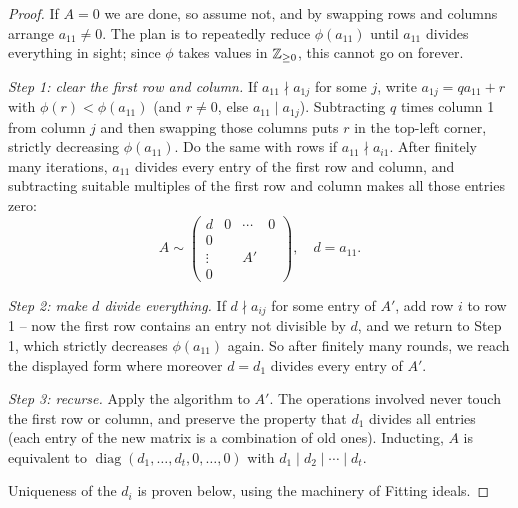 \documentclass[a4paper]{scrartcl}
\begin{document}
\begin{proof}
	If $A = 0$ we are done, so assume not, and by swapping rows and columns arrange $a_{11} \neq 0$. The plan is to repeatedly reduce $\phi(a_{11})$ until $a_{11}$ divides everything in sight; since $\phi$ takes values in $\mathbb{Z}_{\geq 0}$, this cannot go on forever.

	\emph{Step 1: clear the first row and column.} If $a_{11} \nmid a_{1j}$ for some $j$, write $a_{1j} = q a_{11} + r$ with $\phi(r) < \phi(a_{11})$ (and $r \neq 0$, else $a_{11} \mid a_{1j}$). Subtracting $q$ times column 1 from column $j$ and then swapping those columns puts $r$ in the top-left corner, strictly decreasing $\phi(a_{11})$. Do the same with rows if $a_{11} \nmid a_{i1}$. After finitely many iterations, $a_{11}$ divides every entry of the first row and column, and subtracting suitable multiples of the first row and column makes all those entries zero:
	$$
	A \sim \begin{pmatrix}
		d & 0 & \cdots & 0 \\
		0 & & & \\
		\vdots & & A' & \\
		0 & & &
	\end{pmatrix}, \quad d = a_{11}.
	$$

	\emph{Step 2: make $d$ divide everything.} If $d \nmid a_{ij}$ for some entry of $A'$, add row $i$ to row 1 -- now the first row contains an entry not divisible by $d$, and we return to Step 1, which strictly decreases $\phi(a_{11})$ again. So after finitely many rounds, we reach the displayed form where moreover $d = d_1$ divides every entry of $A'$.

	\emph{Step 3: recurse.} Apply the algorithm to $A'$. The operations involved never touch the first row or column, and preserve the property that $d_1$ divides all entries (each entry of the new matrix is a combination of old ones). Inducting, $A$ is equivalent to $\operatorname{diag}(d_1, \dots, d_t, 0, \dots, 0)$ with $d_1 \mid d_2 \mid \cdots \mid d_t$.

	Uniqueness of the $d_i$ is proven below, using the machinery of Fitting ideals.
\end{proof}
\end{document}
